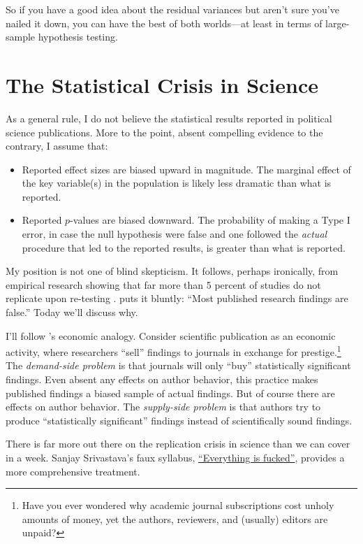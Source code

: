 \documentclass[12pt,oneside,openany]{book}
\begin{document}
So if you have a good idea about the residual variances but aren't sure
you've nailed it down, you can have the best of both worlds---at least
in terms of large-sample hypothesis testing.

\chapter{The Statistical Crisis in Science}\label{crisis}

As a general rule, I do not believe the statistical results reported in
political science publications. More to the point, absent compelling
evidence to the contrary, I assume that:

\begin{itemize}
\item
  Reported effect sizes are biased upward in magnitude. The marginal
  effect of the key variable(s) in the population is likely less
  dramatic than what is reported.
\item
  Reported \(p\)-values are biased downward. The probability of making a
  Type I error, in case the null hypothesis were false and one followed
  the \emph{actual} procedure that led to the reported results, is
  greater than what is reported.
\end{itemize}

My position is not one of blind skepticism. It follows, perhaps
ironically, from empirical research showing that far more than 5 percent
of studies do not replicate upon re-testing \citep{open2015estimating}.
\citet{ioannidis2005most} puts it bluntly: ``Most published research
findings are false.'' Today we'll discuss why.

I'll follow \citet{young2008current}'s economic analogy. Consider
scientific publication as an economic activity, where researchers
``sell'' findings to journals in exchange for prestige.\footnote{Have
  you ever wondered why academic journal subscriptions cost unholy
  amounts of money, yet the authors, reviewers, and (usually) editors
  are unpaid?} The \emph{demand-side problem} is that journals will only
``buy'' statistically significant findings. Even absent any effects on
author behavior, this practice makes published findings a biased sample
of actual findings. But of course there are effects on author behavior.
The \emph{supply-side problem} is that authors try to produce
``statistically significant'' findings instead of scientifically sound
findings.

There is far more out there on the replication crisis in science than we
can cover in a week. Sanjay Srivastava's faux syllabus,
\href{https://hardsci.wordpress.com/2016/08/11/everything-is-fucked-the-syllabus/}{``Everything
is fucked''}, provides a more comprehensive treatment.
\end{document}
